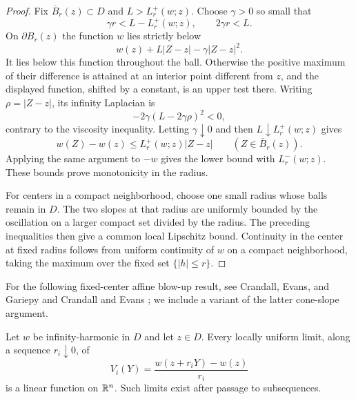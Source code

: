 \begin{proof}
Fix $\overline B_r(z)\subset D$ and $L>L_r^+(w;z)$. Choose $\gamma>0$ so small that
\[
  \gamma r<L-L_r^+(w;z),\qquad 2\gamma r<L.
\]
On $\partial B_r(z)$ the function $w$ lies strictly below
\[
  w(z)+L|Z-z|-\gamma|Z-z|^2.
\]
It lies below this function throughout the ball. Otherwise the positive maximum of their difference is attained at an interior point different from $z$, and the displayed function, shifted by a constant, is an upper test there. Writing $\rho=|Z-z|$, its infinity Laplacian is
\[
  -2\gamma(L-2\gamma\rho)^2<0,
\]
contrary to the viscosity inequality. Letting $\gamma\downarrow0$ and then $L\downarrow L_r^+(w;z)$ gives
\[
  w(Z)-w(z)\le L_r^+(w;z)|Z-z|\qquad (Z\in\overline B_r(z)).
\]
Applying the same argument to $-w$ gives the lower bound with $L_r^-(w;z)$. These bounds prove monotonicity in the radius.

For centers in a compact neighborhood, choose one small radius whose balls remain in $D$. The two slopes at that radius are uniformly bounded by the oscillation on a larger compact set divided by the radius. The preceding inequalities then give a common local Lipschitz bound. Continuity in the center at fixed radius follows from uniform continuity of $w$ on a compact neighborhood, taking the maximum over the fixed set $\{|h|\le r\}$.
\end{proof}

For the following fixed-center affine blow-up result, see Crandall, Evans, and Gariepy \cite{CrandallEvansGariepy2001} and Crandall and Evans \cite[pp.~124--127]{CrandallEvans2001}; we include a variant of the latter cone-slope argument.

\begin{proposition}\label{prop:affine-blowups}
Let $w$ be infinity-harmonic in $D$ and let $z\in D$. Every locally uniform limit, along a sequence $r_i\downarrow0$, of
\[
  V_i(Y)=\frac{w(z+r_iY)-w(z)}{r_i}
\]
is a linear function on $\mathbb{R}^n$. Such limits exist after passage to subsequences.
\end{proposition}

